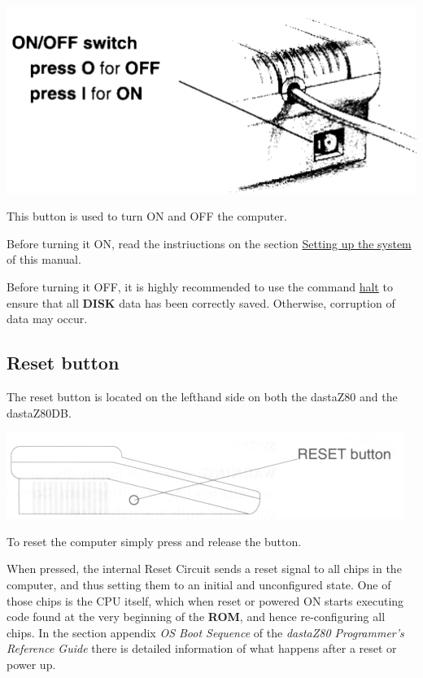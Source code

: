     \includegraphics[scale=0.5]{images/onoffbutton.png}

    This button is used to turn ON and OFF the computer.

    Before turning it ON, read the instriuctions on the section
    \hyperref[sec:setting_system]{Setting up the system} of this manual.

    Before turning it OFF, it is highly recommended to use the command 
    \hyperref[cmd:halt]{halt} to ensure that all \textbf{DISK} data has been
    correctly saved. Otherwise, corruption of data may occur.

    \subsection{Reset button}
    \label{subsec:resetbutton}

    The reset button is located on the lefthand side on both the dastaZ80 and
    the dastaZ80DB.

    \includegraphics[scale=0.7]{images/resetbutton.png}

    To reset the computer simply press and release the button.

    When pressed, the internal Reset Circuit sends a reset signal to all chips
    in the computer, and thus setting them to an initial and unconfigured state.
    One of those chips is the CPU itself, which when reset or powered ON starts
    executing code found at the very beginning of the \textbf{ROM}, and hence
    re-configuring all chips. In the section appendix \textit{OS Boot Sequence}
    of the \textit{dastaZ80 Programmer's Reference Guide}\cite{dastaz80progref}
    there is detailed information of what happens after a reset or power up.

